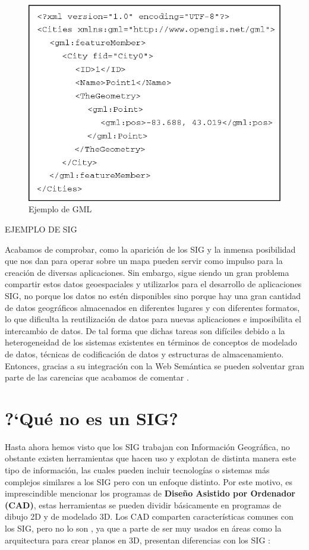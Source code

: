 \begin{figure}[H]
	\centering
	\includegraphics[width=0.65\linewidth]{imagenes/capitulo2/A-GML-representation-of-a-point-feature}
	\caption{Ejemplo de GML \cite{gml}}
	\label{fig:a-gml-representation-of-a-point-feature}
\end{figure}

EJEMPLO DE SIG

Acabamos de comprobar, como la aparición de los SIG y la inmensa posibilidad que nos dan para operar sobre un mapa pueden servir como impulso para la creación de diversas aplicaciones. Sin embargo, sigue siendo un gran problema compartir estos datos geoespaciales y utilizarlos para el desarrollo de aplicaciones SIG, no porque los datos no estén disponibles sino porque hay una gran cantidad de datos geográficos almacenados en diferentes lugares y con diferentes formatos, lo que dificulta la reutilización de datos para nuevas aplicaciones e imposibilita el intercambio de datos. De tal forma que dichas tareas son difíciles debido a la heterogeneidad de los sistemas existentes en términos de conceptos de modelado de datos, técnicas de codificación de datos y estructuras de almacenamiento. Entonces, gracias a su integración con la Web Semántica se pueden solventar gran parte de las carencias que acabamos de comentar \cite{tesis}.

\section{?`Qué no es un SIG?}

Hasta ahora hemos visto que los SIG trabajan con Información Geográfica, no obstante existen herramientas que hacen uso y explotan de distinta manera este tipo de información, las cuales pueden incluir tecnologías o sistemas más complejos similares a los SIG pero con un enfoque distinto. Por este motivo, es imprescindible mencionar los programas de \textbf{Diseño Asistido por Ordenador (CAD)}, estas herramientas se pueden dividir básicamente en programas de dibujo 2D y de modelado 3D. Los CAD comparten características comunes con los SIG, pero no lo son \cite{VictorOlaya}, ya que a parte de ser muy usados en áreas como la arquitectura para crear planos en 3D, presentan diferencias con los SIG \cite{sig-cad}:

